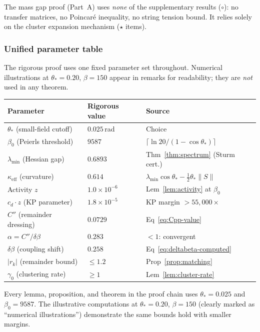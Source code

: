 \documentclass[11pt]{article}
\theoremstyle{definition}
\begin{document}
\noindent
The mass gap proof (Part~A) uses \emph{none} of the supplementary
results ($\circ$): no transfer matrices, no Poincar\'e inequality,
no string tension bound.  It relies solely on the cluster expansion
mechanism ($\star$ items).

\subsubsection*{Unified parameter table}

The rigorous proof uses one fixed parameter set throughout.
Numerical illustrations at $\theta_*=0.20$, $\beta=150$ appear
in remarks for readability; they are \emph{not} used in any theorem.

\begin{center}
\renewcommand{\arraystretch}{1.2}
\begin{tabular}{lll}
\toprule
\textbf{Parameter} & \textbf{Rigorous value} & \textbf{Source} \\
\midrule
$\theta_*$ (small-field cutoff) & $0.025$\,rad & Choice \\
$\beta_0$ (Peierls threshold) & $9587$ &
$\lceil\ln 20/(1-\cos\theta_*)\rceil$ \\
$\lambda_{\min}$ (Hessian gap) & $0.6893$ &
Thm~\ref{thm:spectrum} (Sturm cert.) \\
$\kappa_{\mathrm{eff}}$ (curvature) & $0.614$ &
$\lambda_{\min}\cos\theta_*-\frac{1}{2}\theta_*\|S\|$ \\
Activity $z$ & $1.0\times 10^{-6}$ &
Lem~\ref{lem:activity} at $\beta_0$ \\
$c_d\cdot z$ (KP parameter) & $1.8\times 10^{-5}$ &
KP margin $>55{,}000\times$ \\
$C''$ (remainder dressing) & $0.0729$ &
Eq~\eqref{eq:Cpp-value} \\
$\alpha=C''/\delta\beta$ & $0.283$ & $<1$: convergent \\
$\delta\beta$ (coupling shift) & $0.258$ &
Eq~\eqref{eq:deltabeta-computed} \\
$|r_k|$ (remainder bound) & $\le 1.2$ &
Prop~\ref{prop:matching} \\
$\gamma_0$ (clustering rate) & $\ge 1$ &
Lem~\ref{lem:cluster-rate} \\
\bottomrule
\end{tabular}
\end{center}

\noindent Every lemma, proposition, and theorem in the proof
chain uses $\theta_*=0.025$ and $\beta_0=9587$.
The illustrative computations at $\theta_*=0.20$, $\beta=150$
(clearly marked as ``numerical illustrations'') demonstrate
the same bounds hold with smaller margins.
\end{document}
